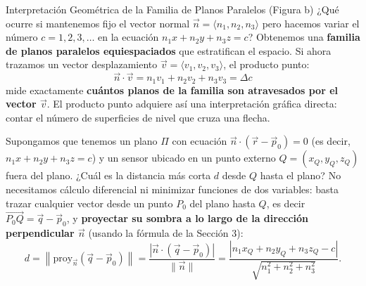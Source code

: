 \documentclass[11pt,letterpaper]{article}
\begin{document}
\begin{intuitionbox}{Interpretación Geométrica de la Familia de Planos Paralelos (Figura b)}
¿Qué ocurre si mantenemos fijo el vector normal $\vec{n} = \langle n_1, n_2, n_3 \rangle$ pero hacemos variar el número $c = 1, 2, 3, \dots$ en la ecuación $n_1 x + n_2 y + n_3 z = c$?
Obtenemos una \textbf{familia de planos paralelos equiespaciados} que estratifican el espacio. Si ahora trazamos un vector desplazamiento $\vec{v} = \langle v_1, v_2, v_3 \rangle$, el producto punto:
\[
\vec{n} \cdot \vec{v} = n_1 v_1 + n_2 v_2 + n_3 v_3 = \Delta c
\]
mide exactamente \textbf{cuántos planos de la familia son atravesados por el vector $\vec{v}$}. El producto punto adquiere así una interpretación gráfica directa: contar el número de superficies de nivel que cruza una flecha.
\end{intuitionbox}


Supongamos que tenemos un plano $\Pi$ con ecuación $\vec{n}\cdot(\vec{r}-\vec{p}_0) = 0$ (es decir, $n_1 x + n_2 y + n_3 z = c$) y un sensor ubicado en un punto externo $Q = (x_Q, y_Q, z_Q)$ fuera del plano. ¿Cuál es la distancia más corta $d$ desde $Q$ hasta el plano?
No necesitamos cálculo diferencial ni minimizar funciones de dos variables: basta trazar cualquier vector desde un punto $P_0$ del plano hasta $Q$, es decir $\overrightarrow{P_0 Q} = \vec{q} - \vec{p}_0$, y \textbf{proyectar su sombra a lo largo de la dirección perpendicular $\vec{n}$} (usando la fórmula de la Sección 3):
\[
d = \left\|\text{proy}_{\vec{n}}(\vec{q} - \vec{p}_0)\right\| = \frac{|\vec{n}\cdot(\vec{q} - \vec{p}_0)|}{\|\vec{n}\|} = \frac{|n_1 x_Q + n_2 y_Q + n_3 z_Q - c|}{\sqrt{n_1^2 + n_2^2 + n_3^2}}.
\]
\end{document}
